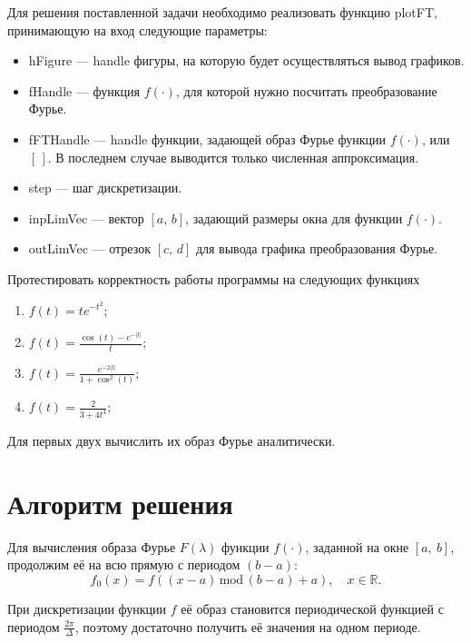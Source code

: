 \documentclass[11pt]{article}
\begin{document}
Для решения поставленной задачи необходимо реализовать функцию plotFT, принимающую на вход следующие параметры:
\begin{itemize}
	\item hFigure --- handle фигуры, на которую будет осуществляться вывод графиков. 
	\item fHandle --- функция $f\left(\cdot\right)$, для которой нужно посчитать преобразование Фурье.
	\item fFTHandle --- handle функции, задающей образ Фурье функции 
	$f\left(\cdot\right)$, или $\left[\,\right]$. В последнем случае выводится только численная 
	аппроксимация.
	\item step --- шаг дискретизации.
	\item inpLimVec --- вектор $\left[a,\, b\right]$, задающий размеры окна 
	для функции $f\left(\cdot\right)$.
	\item outLimVec --- отрезок $\left[c,\, d\right]$ для вывода графика преобразования 
	Фурье. 
\end{itemize}

Протестировать корректность работы программы на следующих функциях
\begin{enumerate}
	\item $f\left(t\right) = te^{-t^2}$;
	\item $f\left(t\right) = \frac{\cos\left(t\right)-e^{-\lvert t\rvert}}{t}$;
	\item $f\left(t\right) = \frac{e^{-2\lvert t\rvert}}{1 + \cos^2\left(t\right)}$;
	\item $f\left(t\right) = \frac{2}{3+4t^4}$;
\end{enumerate}

Для первых двух вычислить их образ Фурье аналитически.

\newpage
\section{Алгоритм решения}

Для вычисления образа Фурье $F\left(\lambda\right)$ функции $f\left(\cdot\right)$, заданной на окне 
$\left[a,\ b\right]$, продолжим её на всю прямую с периодом $\left(b - a\right)$:
$$ f_0\left(x\right) = f\left(\left(x - a\right)\, \mathrm{mod} \, \left(b - a\right) + a\right),
 \quad  x \in \mathbb{R}. $$

При дискретизации функции $f$ её образ становится периодической функцией с периодом $\frac{2\pi}{\Delta}$, 
поэтому достаточно получить её значения на одном периоде.
\end{document}

